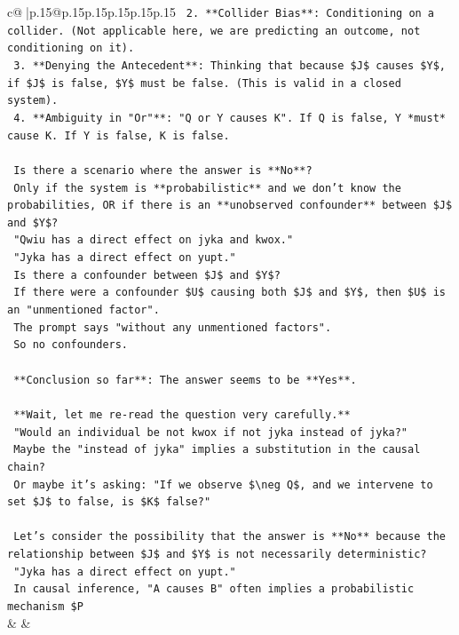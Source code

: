 \documentclass{article}
\begin{document}
{\begin{supertabular}{c@{$\;$}|p{.15\linewidth}@{}p{.15\linewidth}p{.15\linewidth}p{.15\linewidth}p{.15\linewidth}p{.15\linewidth}}
{{{\texttt{        2.  **Collider Bias**: Conditioning on a collider. (Not applicable here, we are predicting an outcome, not conditioning on it).} \\
\texttt{        3.  **Denying the Antecedent**: Thinking that because \$J\$ causes \$Y\$, if \$J\$ is false, \$Y\$ must be false. (This is valid in a closed system).} \\
\texttt{        4.  **Ambiguity in "Or"**: "Q or Y causes K". If Q is false, Y *must* cause K. If Y is false, K is false.} \\
\\ 
\texttt{        Is there a scenario where the answer is **No**?} \\
\texttt{        Only if the system is **probabilistic** and we don't know the probabilities, OR if there is an **unobserved confounder** between \$J\$ and \$Y\$?} \\
\texttt{        "Qwiu has a direct effect on jyka and kwox."} \\
\texttt{        "Jyka has a direct effect on yupt."} \\
\texttt{        Is there a confounder between \$J\$ and \$Y\$?} \\
\texttt{        If there were a confounder \$U\$ causing both \$J\$ and \$Y\$, then \$U\$ is an "unmentioned factor".} \\
\texttt{        The prompt says "without any unmentioned factors".} \\
\texttt{        So no confounders.} \\
\\ 
\texttt{        **Conclusion so far**: The answer seems to be **Yes**.} \\
\\ 
\texttt{        **Wait, let me re{-}read the question very carefully.**} \\
\texttt{        "Would an individual be not kwox if not jyka instead of jyka?"} \\
\texttt{        Maybe the "instead of jyka" implies a substitution in the causal chain?} \\
\texttt{        Or maybe it's asking: "If we observe \$\textbackslash{}neg Q\$, and we intervene to set \$J\$ to false, is \$K\$ false?"} \\
\\ 
\texttt{        Let's consider the possibility that the answer is **No** because the relationship between \$J\$ and \$Y\$ is not necessarily deterministic?} \\
\texttt{        "Jyka has a direct effect on yupt."} \\
\texttt{        In causal inference, "A causes B" often implies a probabilistic mechanism \$P} \\
            }
        }
    }
    & & \\ \\


\end{supertabular}}
\end{document}
